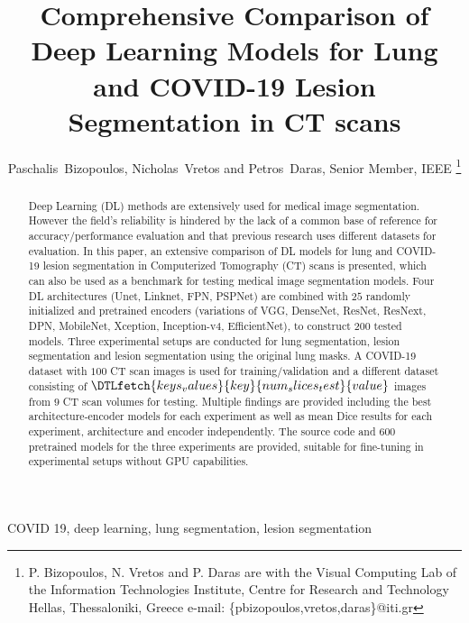 \documentclass[journal]{IEEEtran}
\begin{document}

\title{Comprehensive Comparison of Deep Learning Models for Lung and COVID-19 Lesion Segmentation in CT scans}
\author{Paschalis~Bizopoulos, Nicholas~Vretos and Petros~Daras, Senior Member, IEEE
\thanks{P. Bizopoulos, N. Vretos and P. Daras are with the Visual Computing Lab of the Information Technologies Institute, Centre for Research and Technology Hellas, Thessaloniki, Greece e-mail: \{pbizopoulos,vretos,daras\}@iti.gr}}

\maketitle

\begin{abstract}
	Deep Learning (DL) methods are extensively used for medical image segmentation.
	However the field's reliability is hindered by the lack of a common base of reference for accuracy/performance evaluation and that previous research uses different datasets for evaluation.
	In this paper, an extensive comparison of DL models for lung and COVID-19 lesion segmentation in Computerized Tomography (CT) scans is presented, which can also be used as a benchmark for testing medical image segmentation models.
	Four DL architectures (Unet, Linknet, FPN, PSPNet) are combined with $25$ randomly initialized and pretrained encoders (variations of VGG, DenseNet, ResNet, ResNext, DPN, MobileNet, Xception, Inception-v4, EfficientNet), to construct $200$ tested models.
	Three experimental setups are conducted for lung segmentation, lesion segmentation and lesion segmentation using the original lung masks.
	A COVID-19 dataset with $100$ CT scan images is used for training/validation and a different dataset consisting of $\DTLfetch{keys_values}{key}{num_slices_test}{value}$ images from $9$ CT scan volumes for testing.
	Multiple findings are provided including the best architecture-encoder models for each experiment as well as mean Dice results for each experiment, architecture and encoder independently.
	The source code and $600$ pretrained models for the three experiments are provided, suitable for fine-tuning in experimental setups without GPU capabilities.
\end{abstract}

\begin{IEEEkeywords}
	COVID 19, deep learning, lung segmentation, lesion segmentation
\end{IEEEkeywords}
\end{document}
